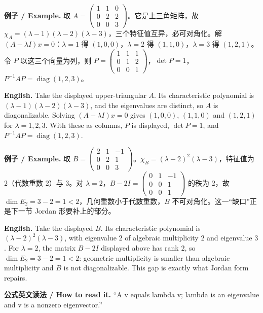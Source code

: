 \documentclass[UTF8,11pt,a4paper]{ctexart}
\newcommand{\EN}[1]{\par\noindent\textbf{English.} #1\par}
\newcommand{\READ}[1]{\par\noindent\textbf{公式英文读法 / How to read it.} #1\par}
\newcommand{\EX}[2]{\par\noindent\textbf{例子 / Example.} #1\par\EN{#2}}
\begin{document}
\EX{取 $A=\begin{pmatrix}1&1&0\\0&2&2\\0&0&3\end{pmatrix}$。它是上三角矩阵，故 $\chi_A=(\lambda-1)(\lambda-2)(\lambda-3)$，三个特征值互异，必可对角化。解 $(A-\lambda I)x=0$：$\lambda=1$ 得 $(1,0,0)$，$\lambda=2$ 得 $(1,1,0)$，$\lambda=3$ 得 $(1,2,1)$。令 $P$ 以这三个向量为列，则 $P=\begin{pmatrix}1&1&1\\0&1&2\\0&0&1\end{pmatrix}$，$\det P=1$，$P^{-1}AP=\operatorname{diag}(1,2,3)$。}{Take the displayed upper-triangular $A$. Its characteristic polynomial is $(\lambda-1)(\lambda-2)(\lambda-3)$, and the eigenvalues are distinct, so $A$ is diagonalizable. Solving $(A-\lambda I)x=0$ gives $(1,0,0)$, $(1,1,0)$ and $(1,2,1)$ for $\lambda=1,2,3$. With these as columns, $P$ is displayed, $\det P=1$, and $P^{-1}AP=\operatorname{diag}(1,2,3)$.}
\EX{取 $B=\begin{pmatrix}2&1&-1\\0&2&1\\0&0&3\end{pmatrix}$。$\chi_B=(\lambda-2)^2(\lambda-3)$，特征值为 $2$（代数重数 $2$）与 $3$。对 $\lambda=2$，$B-2I=\begin{pmatrix}0&1&-1\\0&0&1\\0&0&1\end{pmatrix}$ 的秩为 $2$，故 $\dim E_2=3-2=1<2$，几何重数小于代数重数，$B$ 不可对角化。这一“缺口”正是下一节 Jordan 形要补上的部分。}{Take the displayed $B$. Its characteristic polynomial is $(\lambda-2)^2(\lambda-3)$, with eigenvalue $2$ of algebraic multiplicity $2$ and eigenvalue $3$. For $\lambda=2$, the matrix $B-2I$ displayed above has rank $2$, so $\dim E_2=3-2=1<2$: geometric multiplicity is smaller than algebraic multiplicity and $B$ is not diagonalizable. This gap is exactly what Jordan form repairs.}
\READ{``A v equals lambda v; lambda is an eigenvalue and v is a nonzero eigenvector.''}
\end{document}
